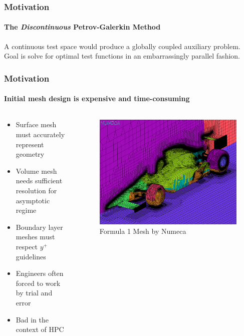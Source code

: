 \documentclass[18pt,xcolor=table]{beamer}
\begin{document}
\begin{frame}[t]
\frametitle{Motivation}
\framesubtitle{The \emph{Discontinuous} Petrov-Galerkin Method}
A continuous test space would produce a globally coupled auxiliary problem.\\
Goal is solve for optimal test functions in an embarrassingly parallel fashion.
\end{frame}


\begin{frame}[t]
\frametitle{Motivation}
\framesubtitle{Initial mesh design is expensive and time-consuming}
\begin{columns}[t]
\begin{column}[c]{0.4\textwidth}
\begin{itemize}
  \item Surface mesh must accurately represent geometry
  \item Volume mesh needs sufficient resolution for asymptotic regime
  \item Boundary layer meshes must respect $y^+$ guidelines
  \item Engineers often forced to work by trial and error
  \item Bad in the context of HPC
\end{itemize}
\end{column}
\begin{column}[c]{0.6\textwidth}
\vspace{2ex}
\begin{figure}[t]
\centering
\includegraphics[width=1.0\textwidth]{Motivation/NumecaRaceCar.png}
\\\small{Formula 1 Mesh by Numeca}\\
\end{figure}
\end{column}
\end{columns}
\end{frame}
\end{document}

